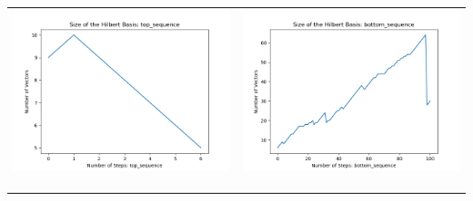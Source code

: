 \documentclass[10pt]{article}
\begin{document}
\begin{tabular}{c|c}
\begin{minipage}{.4\textwidth}
\includegraphics[width=\textwidth]{"DATA/5d/5 generators 2 bound B/top_sequence SIZE"}
\end{minipage} &
\begin{minipage}{.4\textwidth}
\includegraphics[width=\textwidth]{"DATA/5d/5 generators 2 bound B bottomup/bottom_sequence SIZE"}
\end{minipage} \\ \\
\hline \\\begin{minipage}{.4\textwidth}

\end{minipage}
\end{tabular}
\end{document}
